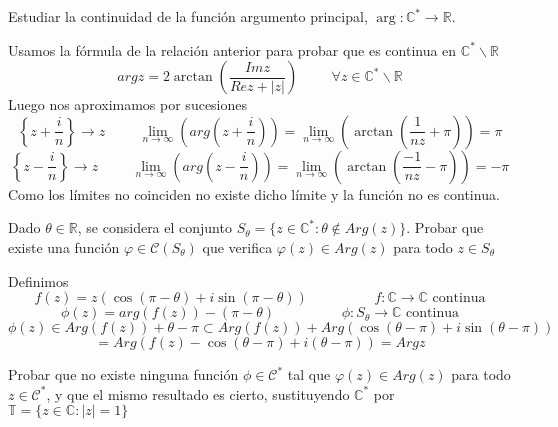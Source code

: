 \begin{ejer}
	Estudiar la continuidad de la función argumento principal, $\arg : \mathbb{C}^{\ast} \rightarrow \mathbb{R}$.
\end{ejer}

\begin{sol}


Usamos la fórmula de la relación anterior para probar que es continua en $\mathbb{C}^{\ast} \backslash \mathbb{R}$
$$  
arg z = 2\arctan \left(\frac{Imz}{Rez + |z|}\right) \hspace{1cm} \forall z\in\mathbb{C}^{\ast}\backslash\mathbb{R}
$$
Luego nos aproximamos por sucesiones
$$  
\left\{ z+\frac{i}{n} \right\} \rightarrow z \hspace{1cm}
\lim_{n\rightarrow\infty}\left(arg\left(z+\frac{i}{n}\right)\right) = \lim_{n\rightarrow\infty}\left( \arctan\left(\frac{1}{nz}+\pi\right) \right) = \pi
$$
$$
\left\{ z-\frac{i}{n} \right\} \rightarrow z \hspace{1cm}
\lim_{n\rightarrow\infty}\left(arg\left(z-\frac{i}{n}\right)\right) = \lim_{n\rightarrow\infty}\left( \arctan\left(\frac{-1}{nz}-\pi\right) \right) = -\pi
$$
Como los límites no coinciden no existe dicho límite y la función no es continua.
\end{sol}

\begin{ejer}
	Dado $\theta\in\mathbb{R}$, se considera el conjunto $S_{\theta} = \{ z\in\mathbb{C}^{\ast} : \theta\not\in Arg(z) \}$. 
	Probar que existe una función $\varphi\in\mathcal{C}(S_{\theta})$ que verifica $\varphi(z)\in Arg(z)$ para todo $z\in S_{\theta}$
\end{ejer}

\begin{sol}
Definimos
$$
f(z) = z( \cos(\pi-\theta) + i\sin(\pi-\theta) ) \hspace{2cm} f:\mathbb{C}\rightarrow \mathbb{C} \text{ continua}
$$
$$
\phi(z) = arg(f(z)) - (\pi-\theta) \hspace{2cm} \phi: S_{\theta} \rightarrow \mathbb{C} \text{ continua}
$$
$$ 
\phi(z) \in Arg (f(z)) + \theta-\pi \subset Arg (f(z)) + Arg( \cos(\theta-\pi)+i\sin(\theta-\pi) ) 
$$
$$= Arg ( f(z)-\cos(\theta-\pi)+i(\theta-\pi) ) = Argz
$$
\end{sol}

\begin{ejer}
	Probar que no existe ninguna función $\phi\in\mathcal{C}^{\ast}$ tal que $\varphi(z)\in Arg(z)$ para todo $z\in\mathcal{C}^{\ast}$, y que el mismo resultado es cierto, sustituyendo $\mathbb{C}^{\ast}$ por $\mathbb{T}=\{ z\in\mathbb{C} : |z|=1 \}$
\end{ejer}

